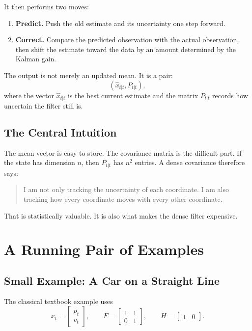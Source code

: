 \documentclass[12pt,a4paper]{article}
\begin{document}
It then performs two moves:
\begin{enumerate}
  \item \textbf{Predict.} Push the old estimate and its uncertainty one step forward.
  \item \textbf{Correct.} Compare the predicted observation with the actual observation, then shift the estimate toward the data by an amount determined by the Kalman gain.
\end{enumerate}

The output is not merely an updated mean. It is a pair:
\[
(\hat{x}_{t|t}, P_{t|t}),
\]
where the vector \(\hat{x}_{t|t}\) is the best current estimate and the matrix \(P_{t|t}\) records how uncertain the filter still is.

\subsection{The Central Intuition}

The mean vector is easy to store. The covariance matrix is the difficult part. If the state has dimension \(n\), then \(P_{t|t}\) has \(n^2\) entries. A dense covariance therefore says:
\begin{quote}
I am not only tracking the uncertainty of each coordinate. I am also tracking how every coordinate moves with every other coordinate.
\end{quote}

That is statistically valuable. It is also what makes the dense filter expensive.

\section{A Running Pair of Examples}

\subsection{Small Example: A Car on a Straight Line}

The classical textbook example uses
\[
x_t =
\begin{bmatrix}
p_t\\
v_t
\end{bmatrix},
\qquad
F =
\begin{bmatrix}
1 & 1\\
0 & 1
\end{bmatrix},
\qquad
H =
\begin{bmatrix}
1 & 0
\end{bmatrix}.
\]
\end{document}
